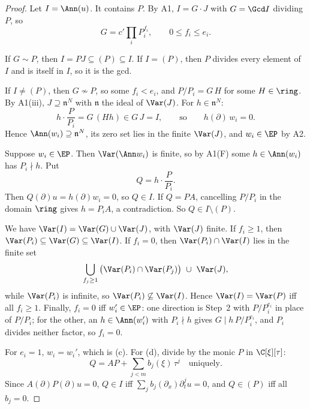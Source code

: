 \begin{proof}
Let $I=\Ann(u)$. It contains $P$. By A1, $I=G\cdot J$ with $G=\Gcd I$ dividing $P$, so
\[
G=c'\prod_iP_i^{f_i},\qquad 0\le f_i\le e_i .
\]

If $G\sim P$, then $I=PJ\subseteq(P)\subseteq I$. If $I=(P)$, then $P$ divides every element of $I$ and is itself in $I$, so it is the gcd.

If $I\ne(P)$, then $G\not\sim P$, so some $f_i<e_i$, and $P/P_i=G\,H$ for some $H\in\ring$. By A1(iii), $J\supseteq\mathfrak n^N$ with $\mathfrak n$ the ideal of $\Var(J)$. For $h\in\mathfrak n^N$:
\[
h\cdot\frac{P}{P_i}=G\,(Hh)\in G\,J=I,
\qquad\text{so}\qquad h(\partial)\,w_i=0 .
\]
Hence $\Ann(w_i)\supseteq\mathfrak n^N$, its zero set lies in the finite $\Var(J)$, and $w_i\in\EP$ by A2.

Suppose $w_i\in\EP$. Then $\Var(\Ann w_i)$ is finite, so by A1(F) some $h\in\Ann(w_i)$ has $P_i\nmid h$. Put
\[
Q=h\cdot\frac{P}{P_i}.
\]
Then $Q(\partial)u=h(\partial)w_i=0$, so $Q\in I$. If $Q=PA$, cancelling $P/P_i$ in the domain $\ring$ gives $h=P_iA$, a contradiction. So $Q\in I\setminus(P)$.

We have $\Var(I)=\Var(G)\cup\Var(J)$, with $\Var(J)$ finite. If $f_i\ge1$, then $\Var(P_i)\subseteq\Var(G)\subseteq\Var(I)$. If $f_i=0$, then $\Var(P_i)\cap\Var(I)$ lies in the finite set
\[
\bigcup_{f_j\ge1}\big(\Var(P_i)\cap\Var(P_j)\big)\ \cup\ \Var(J),
\]
while $\Var(P_i)$ is infinite, so $\Var(P_i)\not\subseteq\Var(I)$. Hence $\Var(I)=\Var(P)$ iff all $f_i\ge1$. Finally, $f_i=0$ iff $w_i'\in\EP$: one direction is Step~2 with $P/P_i^{e_i}$ in place of $P/P_i$; for the other, an $h\in\Ann(w_i')$ with $P_i\nmid h$ gives $G\mid h\,P/P_i^{e_i}$, and $P_i$ divides neither factor, so $f_i=0$.

For $e_i=1$, $w_i=w_i'$, which is (c). For (d), divide by the monic $P$ in $\C[\xi][\tau]$:
\[
Q=AP+\sum_{j<m}b_j(\xi)\,\tau^j\quad\text{uniquely}.
\]
Since $A(\partial)P(\partial)u=0$, $Q\in I$ iff $\sum_jb_j(\partial_x)\partial_t^ju=0$, and $Q\in(P)$ iff all $b_j=0$.

\end{proof}

